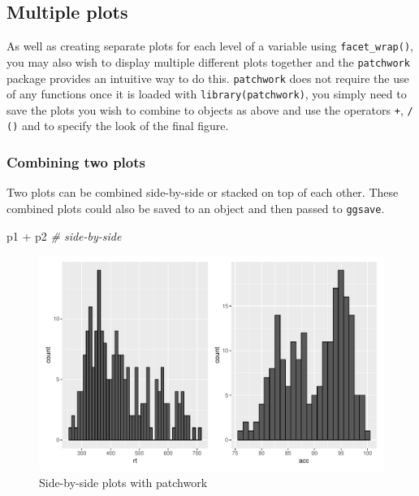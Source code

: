 \documentclass[
  english,
  doc,floatsintext]{apa6}
\newenvironment{Shaded}{\begin{snugshade}}{\end{snugshade}}
\newcommand{\CommentTok}[1]{\textcolor[rgb]{0.56,0.35,0.01}{\textit{#1}}}
\newcommand{\NormalTok}[1]{#1}
\newcommand{\SpecialCharTok}[1]{\textcolor[rgb]{0.00,0.00,0.00}{#1}}
\begin{document}
\hypertarget{multiple-plots}{%
\subsection{Multiple plots}\label{multiple-plots}}

As well as creating separate plots for each level of a variable using \texttt{facet\_wrap()}, you may also wish to display multiple different plots together and the \texttt{patchwork} package provides an intuitive way to do this. \texttt{patchwork} does not require the use of any functions once it is loaded with \texttt{library(patchwork)}, you simply need to save the plots you wish to combine to objects as above and use the operators \texttt{+}, \texttt{/} \texttt{()} and \texttt{\textbar{}} to specify the look of the final figure.

\hypertarget{combining-two-plots}{%
\subsubsection{Combining two plots}\label{combining-two-plots}}

Two plots can be combined side-by-side or stacked on top of each other. These combined plots could also be saved to an object and then passed to \texttt{ggsave}.

\begin{Shaded}
\begin{Highlighting}[]
\NormalTok{p1 }\SpecialCharTok{+}\NormalTok{ p2 }\CommentTok{\# side{-}by{-}side}
\end{Highlighting}
\end{Shaded}

\begin{figure}

{\centering \includegraphics[width=1\linewidth]{images/patchwork-side-1} 

}

\caption{Side-by-side plots with patchwork}\label{fig:patchwork-side}
\end{figure}
\end{document}
